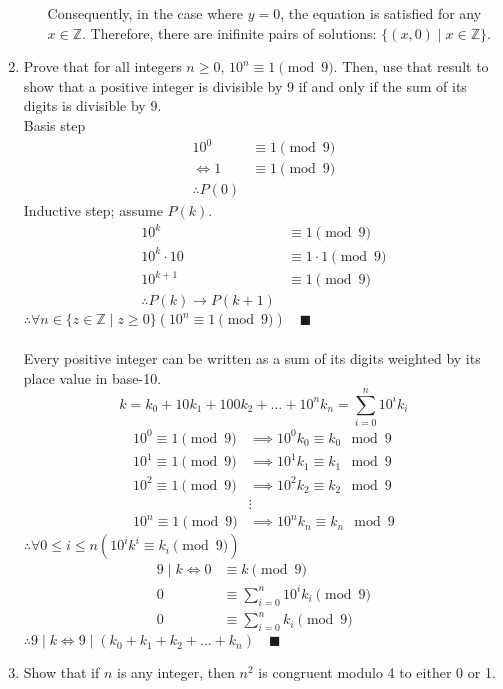 \documentclass[letterpaper, 12pt]{article}
\newcommand{\qed}{\quad \blacksquare}
\newcommand{\then}{\rightarrow}
\newcommand{\Z}{\mathbb{Z}}
\newcommand{\0}{\emptyset}
\begin{document}
\begin{enumerate}
\begin{enumerate}
\begin{flushleft}
    Consequently, in the case where $y = 0$, the equation is satisfied for any $x \in \Z$. 
    Therefore, there are inifinite pairs of solutions: $\{(x, 0) \mid x \in \Z\}$.
\end{flushleft}
\end{enumerate}
\pagebreak
\item Prove that for all integers $n \ge 0$, $10^n \equiv 1 \pmod 9$. Then, use that result to show 
that a positive integer is divisible by 9 if and only if the sum of its digits is divisible by 9. \\
Basis step
\begin{align*}
    10^0 &\equiv 1 \pmod 9 \\
    \iff 1 &\equiv 1 \pmod 9 \\
    \therefore P(0)
\end{align*}
Inductive step; assume $P(k)$.
\begin{align*}
    10^k &\equiv 1 \pmod 9 \\
    10^k \cdot 10 &\equiv 1 \cdot 1 \pmod 9 \\
    10^{k+1} &\equiv 1 \pmod 9 \\
    \therefore P(k) \then P(k+1)
\end{align*}
$\therefore \forall n \in \{z \in \Z \mid z \ge 0\} (10^n \equiv 1 \pmod 9) \qed$ \\
\\
Every positive integer can be written as a sum of its digits weighted by its place value in base-10.
\[k = k_0 + 10k_1 + 100k_2 + \dots + 10^nk_n = \sum_{i=0}^{n} 10^ik_i\]
\begin{align*}
    10^0 \equiv 1 \pmod 9 &\implies 10^0k_0 \equiv k_0 \mod 9 \\
    10^1 \equiv 1 \pmod 9 &\implies 10^1k_1 \equiv k_1 \mod 9 \\
    10^2 \equiv 1 \pmod 9 &\implies 10^2k_2 \equiv k_2 \mod 9 \\
    &\vdots \\
    10^n \equiv 1 \pmod 9 &\implies 10^nk_n \equiv k_n \mod 9
\end{align*}
$\therefore \forall 0 \le i \le n (10^ik^i \equiv k_i \pmod 9)$
\begin{align*}
    9 \mid k \iff 0 &\equiv k \pmod 9 \\
    0 &\equiv \sum_{i=0}^{n} 10^ik_i \pmod 9 \\
    0 &\equiv \sum_{i=0}^{n} k_i \pmod 9
\end{align*}
$\therefore 9 \mid k \iff 9 \mid (k_0 + k_1 + k_2 + \dots + k_n) \qed$
\item Show that if $n$ is any integer, then $n^2$ is congruent modulo 4 to either 0 or 1.

\end{enumerate}
\end{document}
